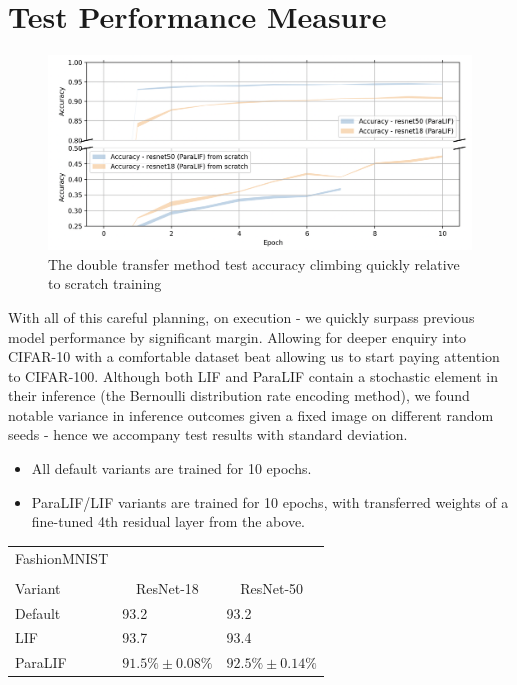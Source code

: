 \documentclass[conference]{IEEEtran}
\begin{document}
\section{Test Performance Measure}
\begin{figure}[h!]
    \centering
    \includegraphics[width=\linewidth]{transfer-contrast.png}
    \caption{The double transfer method test accuracy climbing quickly relative to scratch training}
    \label{fig:transfer_contrast}
\end{figure}

With all of this careful planning, on execution - we quickly surpass previous model performance by significant margin. Allowing for deeper enquiry into CIFAR-10 with a comfortable dataset beat allowing us to start paying attention to CIFAR-100. Although both LIF and ParaLIF contain a stochastic element in their inference (the Bernoulli distribution rate encoding method), we found notable variance in inference outcomes given a fixed image on different random seeds - hence we accompany test results with standard deviation.



\begin{itemize}
    \item All default variants are trained for 10 epochs.
    \item ParaLIF/LIF variants are trained for 10 epochs, with transferred weights of a fine-tuned 4th residual layer from the above.
\end{itemize}

\begin{table}[ht]
\centering
\begin{tabular}{ l l l }
  FashionMNIST \\
  \\
  Variant & \multicolumn{1}{c}{ResNet-18} & \multicolumn{1}{c}{ResNet-50} \\
  \midrule
  Default & \num{93.2} & \num{93.2} \\
  LIF & \num{93.7} & \num{93.4} \\
  ParaLIF & $91.5\% \pm 0.08\%$ & $92.5\% \pm 0.14\%$ \\
  \bottomrule
\end{tabular}
\end{table}
\end{document}
